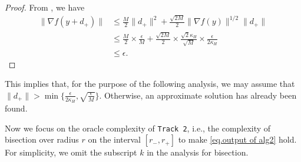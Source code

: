 \documentclass{mcom-l}
\numberwithin{equation}{section}
\begin{document}
\begin{proof}
    From , we have
    \begin{equation*}
        \begin{aligned}
            \|\nabla f(y+d_+)\| & \leq \frac{M}{2}\|d_+\|^2 + \frac{\sqrt{2M}}{2}\|\nabla f(y)\|^{1/2}\|d_+\|                                                          \\
                                & \leq \frac{M}{2}\times \frac{\epsilon}{M}+\frac{\sqrt{2M}}{2}\times\frac{\sqrt{2}\kappa_H}{\sqrt{M}}\times\frac{\epsilon}{2\kappa_H} \\
                                & \leq \epsilon.
        \end{aligned}
    \end{equation*}
\end{proof}
This implies that, for the purpose of the following analysis, we may assume that $\|d_+\| > \min\{\frac{\epsilon}{2\kappa_H},\sqrt{\frac{\epsilon}{M}}\}$. Otherwise, an approximate solution has already been found.

Now we focus on the oracle complexity of \texttt{Track 2}, i.e., the complexity of bisection over radius $r$ on the interval $[r_-,r_+]$ to make \eqref{eq.output of alg2} hold. For simplicity, we omit the subscript $k$ in the analysis for bisection.
\end{document}

